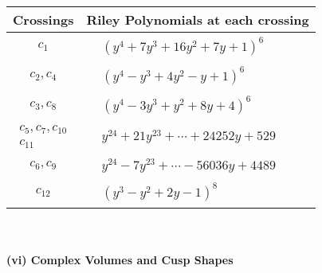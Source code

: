\documentclass[1p]{elsarticle_modified}
\theoremstyle{definition}
\begin{document}
\begin{tabular}{m{50pt}|m{274pt}}
Crossings & \hspace{64pt}Riley Polynomials at each crossing \\
\hline $$\begin{aligned}c_{1}\end{aligned}$$&$\begin{aligned}
&(y^4+7 y^3+16 y^2+7 y+1)^6
\end{aligned}$\\
\hline $$\begin{aligned}c_{2},c_{4}\end{aligned}$$&$\begin{aligned}
&(y^4- y^3+4 y^2- y+1)^6
\end{aligned}$\\
\hline $$\begin{aligned}c_{3},c_{8}\end{aligned}$$&$\begin{aligned}
&(y^4-3 y^3+y^2+8 y+4)^6
\end{aligned}$\\
\hline $$\begin{aligned}c_{5},c_{7},c_{10}\\c_{11}\end{aligned}$$&$\begin{aligned}
&y^{24}+21 y^{23}+\cdots+24252 y+529
\end{aligned}$\\
\hline $$\begin{aligned}c_{6},c_{9}\end{aligned}$$&$\begin{aligned}
&y^{24}-7 y^{23}+\cdots-56036 y+4489
\end{aligned}$\\
\hline $$\begin{aligned}c_{12}\end{aligned}$$&$\begin{aligned}
&(y^3- y^2+2 y-1)^8
\end{aligned}$\\
\hline
\end{tabular}\\~\\
\newpage\flushleft \textbf{(vi) Complex Volumes and Cusp Shapes}
\end{document}
